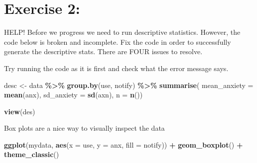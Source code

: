 \documentclass[
]{book}
\newenvironment{Shaded}{\begin{snugshade}}{\end{snugshade}}
\newcommand{\AttributeTok}[1]{\textcolor[rgb]{0.13,0.29,0.53}{#1}}
\newcommand{\CommentTok}[1]{\textcolor[rgb]{0.56,0.35,0.01}{\textit{#1}}}
\newcommand{\ConstantTok}[1]{\textcolor[rgb]{0.56,0.35,0.01}{#1}}
\newcommand{\FunctionTok}[1]{\textcolor[rgb]{0.13,0.29,0.53}{\textbf{#1}}}
\newcommand{\NormalTok}[1]{#1}
\newcommand{\OtherTok}[1]{\textcolor[rgb]{0.56,0.35,0.01}{#1}}
\newcommand{\SpecialCharTok}[1]{\textcolor[rgb]{0.81,0.36,0.00}{\textbf{#1}}}
\let\oldsection\section
\renewcommand{\section}{\needspace{5\baselineskip}\oldsection}
\begin{document}
\begin{Shaded}
\end{Shaded}

\section{Exercise 2:}\label{exercise-2}

HELP! Before we progress we need to run descriptive statistics. However, the code below is broken and incomplete. Fix the code in order to successfully generate the descriptive stats. There are FOUR issues to resolve.

Try running the code as it is first and check what the error message says.

\begin{Shaded}
\begin{Highlighting}[]
\NormalTok{desc }\OtherTok{\textless{}{-}}\NormalTok{ data }\SpecialCharTok{\%\textgreater{}\%}
  \FunctionTok{group.by}\NormalTok{(use, notify) }\SpecialCharTok{\%\textgreater{}\%}
  \FunctionTok{summarise}\NormalTok{(}
    \AttributeTok{mean\_anxiety =} \FunctionTok{mean}\NormalTok{(anx),}
    \AttributeTok{sd\_anxiety =} \FunctionTok{sd}\NormalTok{(axn),}
    \AttributeTok{n =} \FunctionTok{n}\NormalTok{())}
    
\FunctionTok{view}\NormalTok{(des)}
\end{Highlighting}
\end{Shaded}

Box plots are a nice way to visually inspect the data

\begin{Shaded}
\begin{Highlighting}[]
\FunctionTok{ggplot}\NormalTok{(mydata, }\FunctionTok{aes}\NormalTok{(}\AttributeTok{x =}\NormalTok{ use, }\AttributeTok{y =}\NormalTok{ anx, }\AttributeTok{fill =}\NormalTok{ notify)) }\SpecialCharTok{+}
  \FunctionTok{geom\_boxplot}\NormalTok{() }\SpecialCharTok{+}
  \FunctionTok{theme\_classic}\NormalTok{()}
\end{Highlighting}
\end{Shaded}
\end{document}
